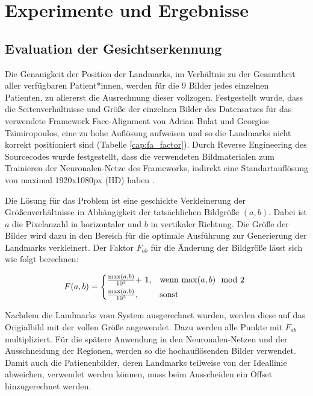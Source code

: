 \chapter{Experimente und Ergebnisse}\label{experiment}

\section{Evaluation der Gesichtserkennung}\label{evalfa}
Die Genauigkeit der Position der Landmarks, im Verhältnis zu der Gesamtheit aller verfügbaren Patient*innen, werden für die 9 Bilder jedes einzelnen Patienten, zu allererst die Ausrechnung dieser vollzogen. Festgestellt wurde, dass die Seitenverhältnisse und Größe der einzelnen Bilder des Datensatzes für das verwendete Framework \glqq Face-Alignment\grqq{} von Adrian Bulat und Georgios Tzimiropoulos, eine zu hohe Auflösung aufweisen und so die Landmarks nicht korrekt positioniert sind (Tabelle \ref{cap:fa_factor}). Durch Reverse Engineering des Sourcecodes wurde festgestellt, dass die verwendeten Bildmaterialen zum Trainieren der Neuronalen-Netze des Frameworks, indirekt eine Standartauflösung von maximal 1920x1080px (HD) haben \cite{fa_framework}.


Die Lösung für das Problem ist eine geschickte Verkleinerung der Größenverhältnisse in Abhängigkeit der tatsächlichen Bildgröße $(a, b)$. Dabei ist $a$ die Pixelanzahl in horizontaler und $b$ in vertikaler Richtung. Die Größe der Bilder wird dazu in den Bereich für die optimale Ausführung zur Generierung der Landmarks verkleinert. Der Faktor $F_{ab}$ für die Änderung der Bildgröße lässt sich wie folgt berechnen:

\begin{equation}
F(a, b) = \begin{cases*}
  \frac{\max(a, b)}{10^{3}} $+ 1$,  & wenn $\max(a, b) \mod 2$  \\
  \frac{\max(a, b)}{10^{3}},        & sonst
\end{cases*}
\end{equation}

Nachdem die Landmarks vom System ausgerechnet wurden, werden diese auf das Origialbild mit der vollen Größe angewendet. Dazu werden alle Punkte mit $F_{ab}$ multipliziert. Für die spätere Anwendung in den Neuronalen-Netzen und der Ausschneidung der Regionen, werden so die hochauflösenden Bilder verwendet. Damit auch die Patienenbilder, deren Landmarks teilweise von der Ideallinie abweichen, verwendet werden können, muss beim Ausscheiden ein Offset hinzugerechnet werden.




